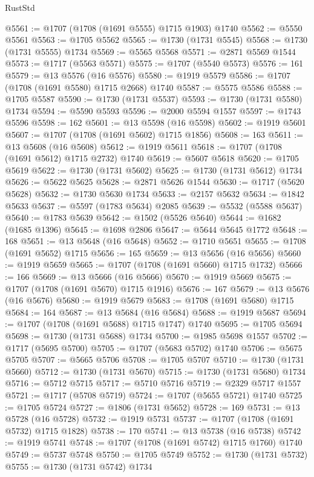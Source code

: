 \begin{lexlean}{RustStd}
\begin{coremodule}
@5561 := @1707 (@1708 (@1691 @5555) @1715 @1903) @1740
@5562 := @5550 @5561
@5563 := @1705 @5562
@5565 := @1730 (@1731 @5545)
@5568 := @1730 (@1731 @5555) @1734
@5569 := @5565 @5568
@5571 := @2871 @5569 @1544
@5573 := @1717 (@5563 @5571)
@5575 := @1707 (@5540 @5573)
@5576 := 161
@5579 := @13 @5576 (@16 @5576)
@5580 := @1919 @5579
@5586 := @1707 (@1708 (@1691 @5580) @1715 @2668) @1740
@5587 := @5575 @5586
@5588 := @1705 @5587
@5590 := @1730 (@1731 @5537)
@5593 := @1730 (@1731 @5580) @1734
@5594 := @5590 @5593
@5596 := @2000 @5594 @1557
@5597 := @1743 @5596
@5598 := 162
@5601 := @13 @5598 (@16 @5598)
@5602 := @1919 @5601
@5607 := @1707 (@1708 (@1691 @5602) @1715 @1856)
@5608 := 163
@5611 := @13 @5608 (@16 @5608)
@5612 := @1919 @5611
@5618 := @1707 (@1708 (@1691 @5612) @1715 @2732) @1740
@5619 := @5607 @5618
@5620 := @1705 @5619
@5622 := @1730 (@1731 @5602)
@5625 := @1730 (@1731 @5612) @1734
@5626 := @5622 @5625
@5628 := @2871 @5626 @1544
@5630 := @1717 (@5620 @5628)
@5632 := @1730 @5630 @1734
@5633 := @2157 @5632
@5634 := @1842 @5633
@5637 := @5597 (@1783 @5634) @2085
@5639 := @5532 (@5588 @5637)
@5640 := @1783 @5639
@5642 := @1502 (@5526 @5640)
@5644 := @1682 (@1685 @1396)
@5645 := @1698 @2806
@5647 := @5644 @5645 @1772
@5648 := 168
@5651 := @13 @5648 (@16 @5648)
@5652 := @1710 @5651
@5655 := @1708 (@1691 @5652) @1715
@5656 := 165
@5659 := @13 @5656 (@16 @5656)
@5660 := @1919 @5659
@5665 := @1707 (@1708 (@1691 @5660) @1715 @1732)
@5666 := 166
@5669 := @13 @5666 (@16 @5666)
@5670 := @1919 @5669
@5675 := @1707 (@1708 (@1691 @5670) @1715 @1916)
@5676 := 167
@5679 := @13 @5676 (@16 @5676)
@5680 := @1919 @5679
@5683 := @1708 (@1691 @5680) @1715
@5684 := 164
@5687 := @13 @5684 (@16 @5684)
@5688 := @1919 @5687
@5694 := @1707 (@1708 (@1691 @5688) @1715 @1747) @1740
@5695 := @1705 @5694
@5698 := @1730 (@1731 @5688) @1734
@5700 := @1985 @5698 @1557
@5702 := @1717 (@5695 @5700)
@5705 := @1707 (@5683 @5702) @1740
@5706 := @5675 @5705
@5707 := @5665 @5706
@5708 := @1705 @5707
@5710 := @1730 (@1731 @5660)
@5712 := @1730 (@1731 @5670)
@5715 := @1730 (@1731 @5680) @1734
@5716 := @5712 @5715
@5717 := @5710 @5716
@5719 := @2329 @5717 @1557
@5721 := @1717 (@5708 @5719)
@5724 := @1707 (@5655 @5721) @1740
@5725 := @1705 @5724
@5727 := @1806 (@1731 @5652)
@5728 := 169
@5731 := @13 @5728 (@16 @5728)
@5732 := @1919 @5731
@5737 := @1707 (@1708 (@1691 @5732) @1715 @1828)
@5738 := 170
@5741 := @13 @5738 (@16 @5738)
@5742 := @1919 @5741
@5748 := @1707 (@1708 (@1691 @5742) @1715 @1760) @1740
@5749 := @5737 @5748
@5750 := @1705 @5749
@5752 := @1730 (@1731 @5732)
@5755 := @1730 (@1731 @5742) @1734

\end{coremodule}
\end{lexlean}
